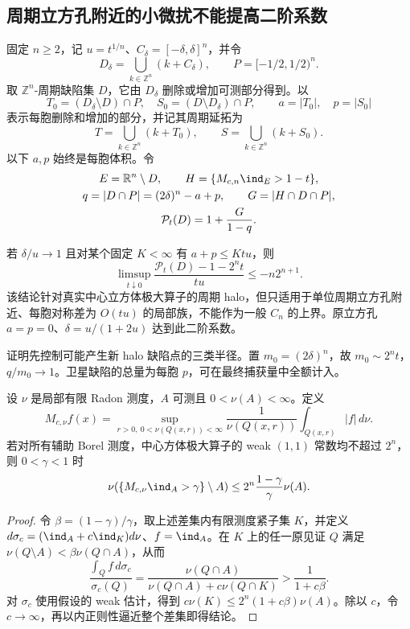 \subsection{周期立方孔附近的小微扰不能提高二阶系数}
\label{sec:periodic-local-lower}

固定 $n\ge2$，记 $u=t^{1/n}$、$C_\delta=[-\delta,\delta]^n$，并令
\[
 D_\delta=\bigcup_{k\in\mathbb Z^n}(k+C_\delta),\qquad
 P=[-1/2,1/2)^n.
\]
取 $\mathbb Z^n$-周期缺陷集 $D$，它由 $D_\delta$ 删除或增加可测部分得到。以
\[
 T_0=(D_\delta\setminus D)\cap P,\quad
 S_0=(D\setminus D_\delta)\cap P,
 \qquad a=|T_0|,\quad p=|S_0|
\]
表示每胞删除和增加的部分，并记其周期延拓为
\[
 T=\bigcup_{k\in\mathbb Z^n}(k+T_0),\qquad
 S=\bigcup_{k\in\mathbb Z^n}(k+S_0).
\]
以下 $a,p$ 始终是每胞体积。令
\[
 \begin{gathered}
 E=\mathbb R^n\setminus D,\qquad H=\{M_{c,n}\ind_E>1-t\},\\
 q=|D\cap P|=(2\delta)^n-a+p,\qquad G=|H\cap D\cap P|,\\
 \mathcal P_t(D)=1+\frac{G}{1-q}.
 \end{gathered}
\]

\begin{theorem}[周期孔局部二阶排除]\label{thm:periodic-local-lower}
若 $\delta/u\to1$ 且对某个固定 $K<\infty$ 有 $a+p\le Ktu$，则
\[
 \limsup_{t\downarrow0}\frac{\mathcal P_t(D)-1-2^nt}{tu}
 \le -n2^{n+1}.
\]
该结论针对真实中心立方体极大算子的周期 halo，但只适用于单位周期立方孔附近、每胞对称差为 $O(tu)$ 的局部族，不能作为一般 $C_n$ 的上界。原立方孔 $a=p=0$、$\delta=u/(1+2u)$ 达到此二阶系数。
\end{theorem}

证明先控制可能产生新 halo 缺陷点的三类半径。置 $m_0=(2\delta)^n$，故 $m_0\sim2^nt$，$q/m_0\to1$。卫星缺陷的总量为每胞 $p$，可在最终捕获量中全额计入。

\begin{lemma}[内禀小半径估计]\label{lem:intrinsic-small-radius}
设 $\nu$ 是局部有限 Radon 测度，$A$ 可测且 $0<\nu(A)<\infty$。定义
\[
 M_{c,\nu}f(x)=\sup_{r>0,\ 0<\nu(Q(x,r))<\infty}
 \frac{1}{\nu(Q(x,r))}\int_{Q(x,r)}|f|\,d\nu.
\]
若对所有辅助 Borel 测度，中心方体极大算子的 weak $(1,1)$ 常数均不超过 $2^n$，则 $0<\gamma<1$ 时
\[
 \nu(\{M_{c,\nu}\ind_A>\gamma\}\setminus A)
 \le 2^n\frac{1-\gamma}{\gamma}\nu(A).
\]
\end{lemma}
\begin{proof}
令 $\beta=(1-\gamma)/\gamma$，取上述差集内有限测度紧子集 $K$，并定义
$d\sigma_c=(\ind_A+c\ind_K)d\nu$、$f=\ind_A$。在 $K$ 上的任一原见证 $Q$ 满足 $\nu(Q\setminus A)<\beta\nu(Q\cap A)$，从而
\[
 \frac{\int_Q f\,d\sigma_c}{\sigma_c(Q)}
 =\frac{\nu(Q\cap A)}{\nu(Q\cap A)+c\nu(Q\cap K)}
 >\frac1{1+c\beta}.
\]
对 $\sigma_c$ 使用假设的 weak 估计，得到
$c\nu(K)\le2^n(1+c\beta)\nu(A)$。除以 $c$，令 $c\to\infty$，再以内正则性逼近整个差集即得结论。
\end{proof}

